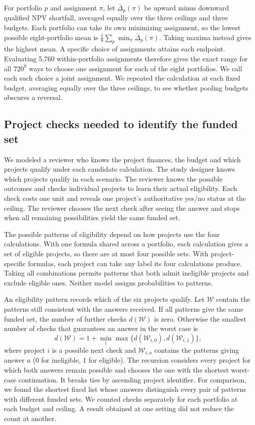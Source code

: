 \documentclass[ijfs,article,submit,oneauthor]{Definitions/mdpi}
\begin{document}
For portfolio $p$ and assignment $\pi$, let $\bar\Delta_p(\pi)$ be upward minus downward qualified NPV shortfall, averaged equally over the three ceilings and three budgets. Each portfolio can take its own minimizing assignment, so the lowest possible eight-portfolio mean is $\tfrac18\sum_p\min_\pi\bar\Delta_p(\pi)$. Taking maxima instead gives the highest mean. A specific choice of assignments attains each endpoint. Evaluating 5,760 within-portfolio assignments therefore gives the exact range for all $720^8$ ways to choose one assignment for each of the eight portfolios. We call each such choice a joint assignment. We repeated the calculation at each fixed budget, averaging equally over the three ceilings, to see whether pooling budgets obscures a reversal.

\subsection{Project checks needed to identify the funded set}
We modeled a reviewer who knows the project finances, the budget and which projects qualify under each candidate calculation. The study designer knows which projects qualify in each scenario. The reviewer knows the possible outcomes and checks individual projects to learn their actual eligibility. Each check costs one unit and reveals one project's authoritative yes/no status at the ceiling. The reviewer chooses the next check after seeing the answer and stops when all remaining possibilities yield the same funded set.

The possible patterns of eligibility depend on how projects use the four calculations. With one formula shared across a portfolio, each calculation gives a set of eligible projects, so there are at most four possible sets. With project-specific formulas, each project can take any label its four calculations produce. Taking all combinations permits patterns that both admit ineligible projects and exclude eligible ones. Neither model assigns probabilities to patterns.

An eligibility pattern records which of the six projects qualify. Let $\mathcal W$ contain the patterns still consistent with the answers received. If all patterns give the same funded set, the number of further checks $d(\mathcal W)$ is zero. Otherwise the smallest number of checks that guarantees an answer in the worst case is
\begin{equation}
 d(\mathcal W)=1+\min_i\max\{d(\mathcal W_{i,0}),d(\mathcal W_{i,1})\}, \label{eq:tree}
\end{equation}
where project $i$ is a possible next check and $\mathcal W_{i,a}$ contains the patterns giving answer $a$ (0 for ineligible, 1 for eligible). The recursion considers every project for which both answers remain possible and chooses the one with the shortest worst-case continuation. It breaks ties by ascending project identifier. For comparison, we found the shortest fixed list whose answers distinguish every pair of patterns with different funded sets. We counted checks separately for each portfolio at each budget and ceiling. A result obtained at one setting did not reduce the count at another.
\end{document}
